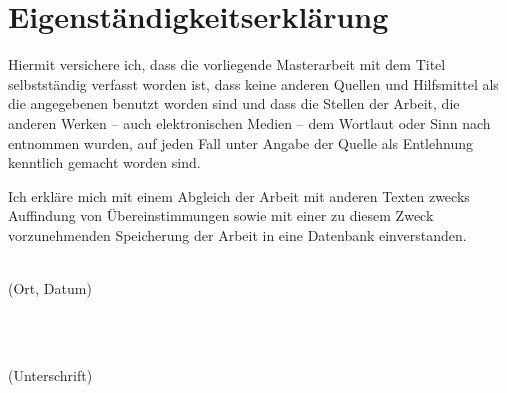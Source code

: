 \chapter*{Eigenständigkeitserklärung}
\label{sec:declaration}
Hiermit versichere ich, dass die vorliegende Masterarbeit mit dem Titel \textit{\thesisTitle} selbstständig verfasst worden ist, dass keine anderen Quellen und Hilfsmittel als die angegebenen benutzt worden sind und dass die Stellen der Arbeit, die anderen Werken -- auch elektronischen Medien -- dem Wortlaut oder Sinn nach entnommen wurden, auf jeden Fall unter Angabe der Quelle als Entlehnung kenntlich gemacht worden sind.

Ich erkläre mich mit einem Abgleich der Arbeit mit anderen Texten zwecks Auffindung von Übereinstimmungen sowie mit einer zu diesem Zweck vorzunehmenden Speicherung der Arbeit in eine Datenbank einverstanden.

\vspace*{2cm}

\begin{minipage}{0.5\textwidth}
	\begin{flushleft} \large
		\underline{\hspace{6cm}} \\
		{\footnotesize (Ort, Datum)}
	\end{flushleft}
\end{minipage}
~
\begin{minipage}{0.5\textwidth}
	\begin{flushright} \large
		\underline{\hspace{6cm}} \\
		{\footnotesize (Unterschrift)}
	\end{flushright}
\end{minipage}\\[0.5cm]
